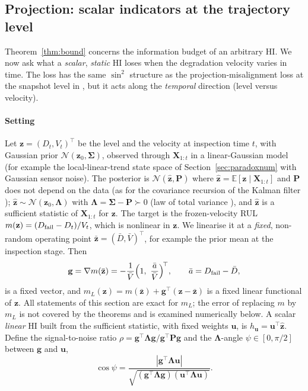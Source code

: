 \documentclass[preprint,12pt]{elsarticle}
\theoremstyle{definition}
\newcommand{\E}{\mathbb{E}}
\begin{document}
\subsection{Projection: scalar indicators at the trajectory level}
\label{sec:angular}
Theorem~\ref{thm:bound} concerns the information budget of an arbitrary HI. We now ask what a \emph{scalar}, \emph{static} HI loses when the degradation velocity varies in time. The loss has the same $\sin^2$ structure as the projection-misalignment loss at the snapshot level in \cite{le2026jestch}, but it acts along the \emph{temporal} direction (level versus velocity).

\paragraph{Setting} Let $\mathbf z=(D_t,V_t)^\top$ be the level and the velocity at inspection time $t$, with Gaussian prior $\mathcal N(\mathbf z_0,\boldsymbol\Sigma)$, observed through $\mathbf{X}_{1:t}$ in a linear-Gaussian model (for example the local-linear-trend state space \cite{harvey1989,durbin2012} of Section~\ref{sec:paradoxnum} with Gaussian sensor noise). The posterior is $\mathcal N(\hat{\mathbf z},\mathbf P)$ where $\hat{\mathbf z}=\E[\mathbf z\mid\mathbf{X}_{1:t}]$ and $\mathbf P$ does not depend on the data (as for the covariance recursion of the Kalman filter \cite{kalman1960,durbin2012}); $\hat{\mathbf z}\sim\mathcal N(\mathbf z_0,\boldsymbol\Lambda)$ with $\boldsymbol\Lambda=\boldsymbol\Sigma-\mathbf P\succ0$ (law of total variance \cite[Sect.~1.5.5]{bishop2006}), and $\hat{\mathbf z}$ is a sufficient statistic of $\mathbf{X}_{1:t}$ for $\mathbf z$. The target is the frozen-velocity RUL $m(\mathbf z)=(D_{\rm fail}-D_t)/V_t$, which is nonlinear in $\mathbf z$. We linearise it at a \emph{fixed}, non-random operating point $\bar{\mathbf z}=(\bar D,\bar V)^\top$, for example the prior mean at the inspection stage. Then
\begin{equation}
\mathbf g=\nabla m(\bar{\mathbf z})=-\frac{1}{\bar V}\Big(1,\ \frac{\bar a}{\bar V}\Big)^{\!\top},\qquad \bar a=D_{\rm fail}-\bar D,
\end{equation}
is a fixed vector, and $m_L(\mathbf z)=m(\bar{\mathbf z})+\mathbf g^\top(\mathbf z-\bar{\mathbf z})$ is a fixed linear functional of $\mathbf z$. All statements of this section are exact for $m_L$; the error of replacing $m$ by $m_L$ is not covered by the theorems and is examined numerically below. A scalar \emph{linear} HI built from the sufficient statistic, with fixed weights $\mathbf u$, is $h_{\mathbf u}=\mathbf u^\top\hat{\mathbf z}$. Define the signal-to-noise ratio $\rho=\mathbf g^\top\boldsymbol\Lambda\mathbf g/\mathbf g^\top\mathbf P\mathbf g$ and the $\boldsymbol\Lambda$-angle $\psi\in[0,\pi/2]$ between $\mathbf g$ and $\mathbf u$,
\begin{equation}
\cos\psi=\frac{|\mathbf g^\top\boldsymbol\Lambda\mathbf u|}{\sqrt{(\mathbf g^\top\boldsymbol\Lambda\mathbf g)(\mathbf u^\top\boldsymbol\Lambda\mathbf u)}}.
\end{equation}
\end{document}
